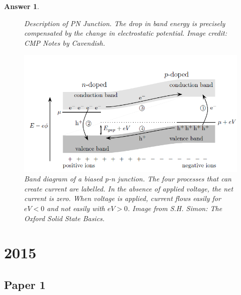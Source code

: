 \documentclass[a4paper]{article}
\newtheorem{ans}{Answer}[subsection]
\theoremstyle{new}
\begin{document}
\begin{ans}
\begin{figure}[H]
    \caption{Description of PN Junction. The drop in band energy is precisely compensated by the change in electrostatic potential. Image credit: CMP Notes by Cavendish.}
\end{figure}
\begin{figure}[H]
    \centering
    \includegraphics[width=\linewidth]{biasedPN.PNG}
    \caption{Band diagram of a biased p-n junction. The four processes that can create current are labelled. In the absence of applied voltage, the net current is zero. When voltage is applied, current flows easily for $eV<0$ and not easily with $eV>0$. Image from S.H. Simon: The Oxford Solid State Basics. }
\end{figure}
\end{ans}
\newpage
\section{2015}
\subsection{Paper 1}
\end{document}
